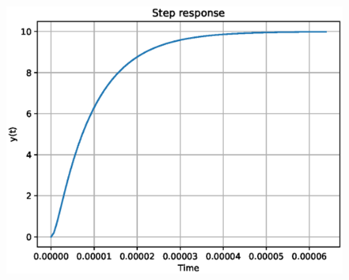 \begin{enumerate}[label=\thesubsection.\arabic*.,ref=\thesubsection.\theenumi]
\begin{figure}[!ht]
\includegraphics[width=\columnwidth]{./figs/ee18btech11005/ee18btech11005_2.eps}
\caption{}
\label{fig:ee18btech11005_2}
\end{figure}


\end{enumerate}
